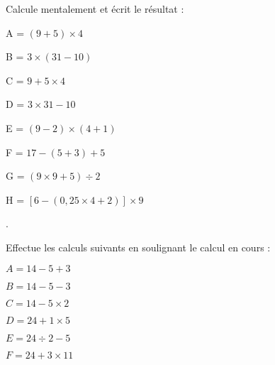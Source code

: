 \begin{exercice}
Calcule mentalement et écrit le résultat :
 \begin{colitemize}{2}
 \item A = $(9 + 5) \times 4$

 \dotfill
 
 \item B = $3 \times (31 - 10)$
 
 \dotfill
 
 \item C = $9 + 5 \times 4$

 \dotfill
 
 \item D = $3 \times 31 - 10$   
 
 \dotfill
   
 \item E = $(9 - 2) \times (4 + 1)$
 
 \dotfill
 
 \item F = $17 - (5 + 3) + 5$
 
 \dotfill
 
 \item G = $(9 \times 9 + 5) \div 2$
 
 \dotfill
   
 \item {\footnotesize H = $[6 - (0,25 \times 4 + 2)] \times 9$}
 
 \dotfill.
 \end{colitemize}
\end{exercice}

\vspace{2cm}

\begin{exercice}
Effectue les calculs suivants en soulignant le calcul en cours :
 \begin{colitemize}{2}
\item $A = 14 - 5 + 3$

\dotfill

\dotfill

\item $B = 14 - 5 - 3$

\dotfill

\dotfill
	
\item $C = 14 - 5 \times 2$

\dotfill

\dotfill

\item $D = 24 + 1 \times 5$

\dotfill

\dotfill
	
\item $E = 24 \div 2 - 5$

\dotfill

\dotfill
	
\item $F = 24 + 3 \times 11$

\dotfill

\dotfill

 \end{colitemize}
\end{exercice}


